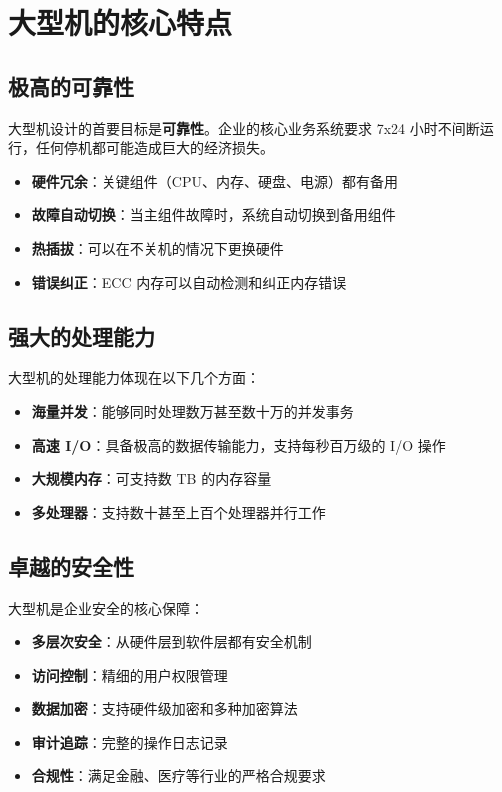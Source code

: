 \documentclass[12pt,UTF8]{ctexbook}
\begin{document}
\chapter{大型机的核心特点}
\label{chap:features}

\section{极高的可靠性}

大型机设计的首要目标是\textbf{可靠性}。企业的核心业务系统要求 7x24 小时不间断运行，任何停机都可能造成巨大的经济损失。

\begin{itemize}[leftmargin=2cm]
    \item \textbf{硬件冗余}：关键组件（CPU、内存、硬盘、电源）都有备用
    \item \textbf{故障自动切换}：当主组件故障时，系统自动切换到备用组件
    \item \textbf{热插拔}：可以在不关机的情况下更换硬件
    \item \textbf{错误纠正}：ECC 内存可以自动检测和纠正内存错误
\end{itemize}

\section{强大的处理能力}

大型机的处理能力体现在以下几个方面：

\begin{itemize}[leftmargin=2cm]
    \item \textbf{海量并发}：能够同时处理数万甚至数十万的并发事务
    \item \textbf{高速 I/O}：具备极高的数据传输能力，支持每秒百万级的 I/O 操作
    \item \textbf{大规模内存}：可支持数 TB 的内存容量
    \item \textbf{多处理器}：支持数十甚至上百个处理器并行工作
\end{itemize}

\section{卓越的安全性}

大型机是企业安全的核心保障：

\begin{itemize}[leftmargin=2cm]
    \item \textbf{多层次安全}：从硬件层到软件层都有安全机制
    \item \textbf{访问控制}：精细的用户权限管理
    \item \textbf{数据加密}：支持硬件级加密和多种加密算法
    \item \textbf{审计追踪}：完整的操作日志记录
    \item \textbf{合规性}：满足金融、医疗等行业的严格合规要求
\end{itemize}
\end{document}
